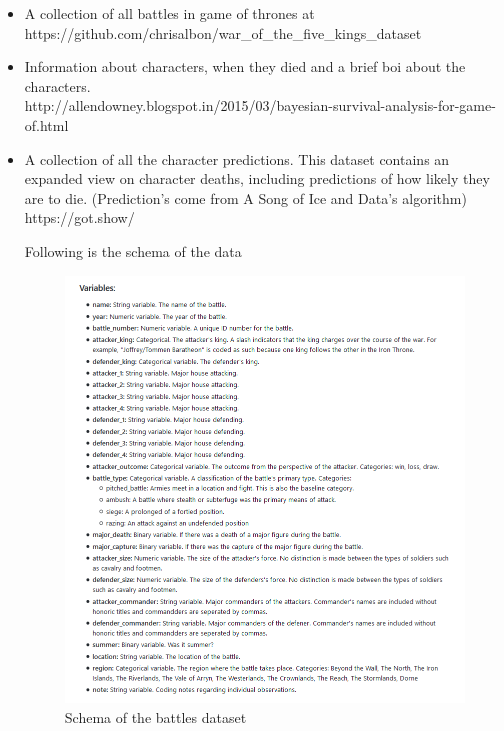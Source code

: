 \documentclass[]{article}
\begin{document}
\begin{itemize}
\item A collection of all battles in game of thrones at\\ 
https://github.com/chrisalbon/war\_of\_the\_five\_kings\_dataset


\item Information about characters, when they died and a brief boi about the characters.\\
http://allendowney.blogspot.in/2015/03/bayesian-survival-analysis-for-game-of.html


\item A collection of all the character predictions. This dataset contains an expanded view on character deaths, including predictions of how likely they are to die. (Prediction's come from A Song of Ice and Data's algorithm)\\
https://got.show/

Following is the schema of the data

\begin{figure}
\centering
        \includegraphics[totalheight=16cm]{battles.png}
        \caption{Schema of the battles dataset}
\end{figure}



\end{itemize}
\end{document}
